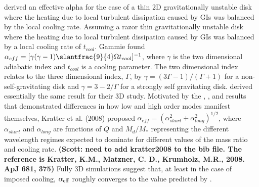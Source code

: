 \documentclass[manuscript]{aastex} %
\begin{document}
\citet{gammie2001} derived an effective alpha for the case of a thin 2D gravitationally unstable disk where the heating due to local turbulent dissipation caused by GIs was balanced by the local cooling rate.  
Assuming a razor thin gravitationally unstable disk where the heating due to local turbulent dissipation caused by
GIs was balanced by a local cooling rate of $t_{cool}$.
Gammie found
$\alpha_{eff} = [\gamma(\gamma - 1) \slantfrac{9}{4}\Omega t_{cool}]^{-1}$,
where $\gamma$ is the two dimensional adiabatic index and $t_{cool}$ is a cooling parameter. 
The two dimensional index relates
to the three dimensional index, $\Gamma$, by 
$\gamma = (3\Gamma - 1) / (\Gamma + 1)$
for a non-self-gravitating
disk and
$\gamma = 3 - 2/\Gamma $
for a strongly self gravitating disk.   \cite{lodato2004} derived essentially the same result for their 3D study.
Motivated by
the \cite{laughlin1996}, \cite{gammie2001}, and \cite{lodato2004, lodato2005} results 
that demonstrated differences in how low and high order modes manifest themselves, Kratter et al. (2008) 
proposed $\alpha_{eff} = (\alpha_{short}^2 + \alpha_{long}^2)^{1/2}$, where $\alpha_{short}$ and $\alpha_{long}$
are functions of $Q$ and $M_d/M_*$ representing 
the different wavelength regimes expected to dominate for different values of the mass ratio and cooling rate. 
{\bf (Scott: need to add kratter2008 to the bib file.  The reference is Kratter, K.M., Matzner, C. D., Krumholz, M.R., 
2008. ApJ 681, 375)}
Fully 3D simulations \citep[e.g.][]{lodato2004, cossins2009} suggest that, at least in the case of imposed cooling, $\alpha_{\rm{eff}}$ roughly converges to the value predicted by \citeauthor{gammie2001}. 
\end{document}
